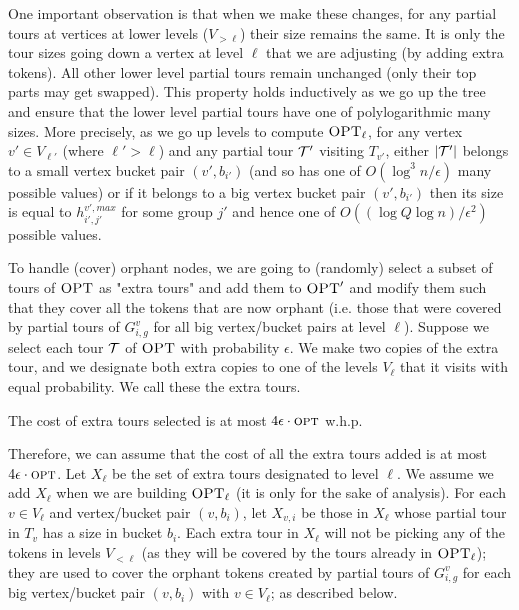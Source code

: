 \documentclass[twoside,leqno]{article}
\newcommand{\calT}{{\cal T}}
\newcommand{\opt}{\mbox{\sc opt}}
\newcommand{\OPT}{\mbox{\sc OPT}}
\newcommand{\eps}{\epsilon}
\begin{document}
One important observation is that when we make these changes, for any partial tours at vertices at lower levels ($V_{>\ell}$)
their size remains the same. It is only the tour sizes going down a vertex at level $\ell$ that we are adjusting (by adding extra
tokens). All other lower level partial tours remain unchanged (only their top parts may get swapped). This property holds inductively
as we go up the tree and ensure that the lower level partial tours have one of polylogarithmic many sizes.
More precisely, as we go up levels to compute  $\OPT_\ell$, for any vertex $v'\in V_{\ell'}$ (where $\ell'>\ell$) and any partial
tour $\calT'$ visiting $T_{v'}$, either $|\calT'|$ belongs to a small vertex bucket pair $(v',b_{i'})$ (and so has one of
$O(\log^3 n/\eps)$ many possible values) or if it belongs to a big
vertex bucket pair $(v',b_{i'})$ then its size is equal to $h^{v',max}_{i',j'}$ for some group $j'$ and hence one of
$O((\log Q\log n)/\eps^2)$ possible values.

To handle (cover) orphant nodes, we are going to (randomly) select a subset of tours of $\OPT$ as "extra tours" and add them to $\OPT'$ and modify them
such that they cover all the tokens that are now orphant (i.e. those that were covered by partial tours of $G^v_{i,g}$ for all big vertex/bucket pairs at level $\ell$).
Suppose we select each tour $\calT$ of $\OPT$ with probability $\eps$. We make two copies of the extra tour, and we designate both extra copies to one of the levels $V_\ell$ that it visits with equal probability. We call these the extra tours.
\vspace{-1.5mm}
\begin{lemma}\label{lem:extra-cost}
The cost of extra tours selected is at most $4\eps\cdot\opt$ w.h.p.
\end{lemma}
\vspace{-1.5mm}

Therefore, we can assume that the cost of all the extra tours added  is at most $4\eps\cdot\opt$.
Let $X_\ell$ be the set of extra tours designated to level $\ell$.
We assume we add $X_\ell$ when we are building $\OPT_\ell$
(it is only for the sake of analysis). For each $v\in V_\ell$ and vertex/bucket pair $(v,b_i)$, let $X_{v,i}$ be those in $X_\ell$ whose partial tour in $T_v$ has
a size in bucket $b_i$. Each extra tour in $X_\ell$
will not be picking any of the tokens in levels $V_{<\ell}$ (as they will be covered by the tours already in $\OPT_\ell$);
they are used to cover the orphant tokens created by partial tours
of $G^v_{i,g}$ for each big vertex/bucket pair $(v,b_i)$ with $v\in V_\ell$; as described below.
\end{document}
